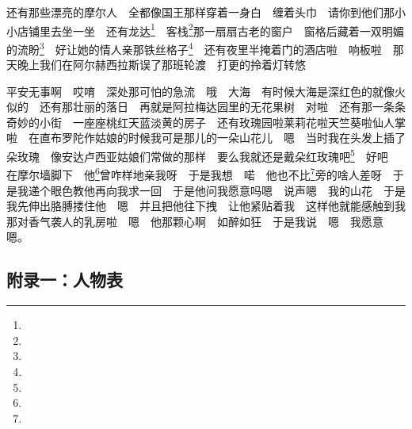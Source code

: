 \par 还有那些漂亮的摩尔人　全都像国王那样穿着一身白　缠着头巾　请你到他们那小小店铺里去坐一坐　还有龙达\footnote{}　客栈\footnote{}那一扇扇古老的窗户　窗格后藏着一双明媚的流盼\footnote{}　好让她的情人亲那铁丝格子\footnote{}　还有夜里半掩着门的酒店啦　响板啦　那天晚上我们在阿尔赫西拉斯误了那班轮渡　打更的拎着灯转悠　
\par 平安无事啊　哎唷　深处那可怕的急流　哦　大海　有时候大海是深红色的就像火似的　还有那壮丽的落日　再就是阿拉梅达园里的无花果树　对啦　还有那一条条奇妙的小街　一座座桃红天蓝淡黄的房子　还有玫瑰园啦莱莉花啦天竺葵啦仙人掌啦　在直布罗陀作姑娘的时候我可是那儿的一朵山花儿　嗯　当时我在头发上插了朵玫瑰　像安达卢西亚姑娘们常做的那样　要么我就还是戴朵红玫瑰吧\footnote{}　好吧　在摩尔墙脚下　他\footnote{}曾咋样地亲我呀　于是我想　喏　他也不比\footnote{}旁的啥人差呀　于是我递个眼色教他再向我求一回　于是他问我愿意吗嗯　说声嗯　我的山花　于是我先伸出胳膊搂住他　嗯　并且把他往下拽　让他紧贴着我　这样他就能感触到我那对香气袭人的乳房啦　嗯　他那颗心啊　如醉如狂　于是我说　嗯　我愿意　嗯。　
\par {}















\clearpage
\subsection*{附录一：人物表}

